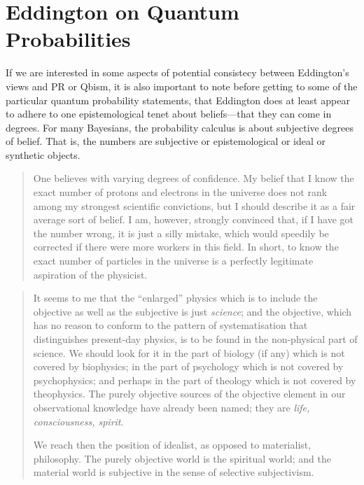 \section{Eddington on Quantum Probabilities}

If we are interested in some aspects of potential consistecy between Eddington's views and PR or Qbism, it is also important to note before getting to some of the particular quantum probability statements, that Eddington does at least appear to adhere to one epistemological tenet about beliefs---that they can come in degrees.  For many Bayesians, the probability calculus is about subjective degrees of belief.  That is, the numbers are subjective or epistemological or ideal or synthetic objects.

\begin{quote}
    One believes with varying degrees of confidence.  My belief that I know the exact number of protons and electrons in the universe does not rank among my strongest scientific convictions, but I should describe it as a fair average sort of belief.  I am, however, strongly convinced that, if I have got the number wrong, it is just a silly mistake, which would speedily be corrected if there were more workers in this field.  In short, to know the exact number of particles in the universe is a perfectly legitimate aspiration of the physicist.  \citep[p. 171]{Eddington1939}
\end{quote}




\begin{quote}
    It seems to me that the ``enlarged'' physics which is to include the objective as well as the subjective is just \emph{science}; and the objective, which has no reason to conform to the pattern of systematisation that distinguishes present-day physics, is to be found in the non-physical part of science.  We should look for it in the part of biology (if any) which is not covered by biophysics; in the part of psychology which is not covered by psychophysics; and perhaps in the part of theology which is not covered by theophysics.  The purely objective sources of the objective element in our observational knowledge have already been named; they are \emph{life, consciousness, spirit}.
    
    We reach then the position of idealist, as opposed to materialist, philosophy.  The purely objective world is the spiritual world; and the material world is subjective in the sense of selective subjectivism.
    
    \citep[p. 68-69]{Eddington1939}
\end{quote}

